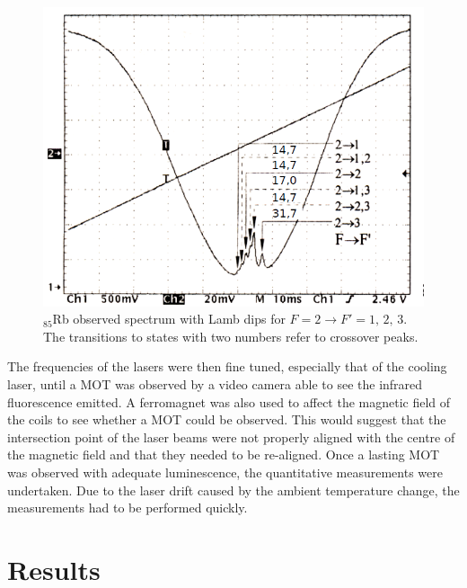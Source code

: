 \documentclass[twocolumn]{article}
\begin{document}
\begin{figure} [!h]
	\centering
	\includegraphics[width=1\linewidth]{Images/Peak1.png}
	\caption{$_{85}$Rb observed spectrum with Lamb dips for $F = 2 \rightarrow F' = 1, \, 2, \, 3$. The transitions to states with two numbers refer to crossover peaks.\cite{manual}}
	\label{fig:Peaks1}
\end{figure}
The frequencies of the lasers were then fine tuned, especially that of the cooling laser, until a MOT was observed by a video camera able to see the infrared fluorescence emitted. A ferromagnet was also used to affect the magnetic field of the coils to see whether a MOT could be observed. This would suggest that the intersection point of the laser beams were not properly aligned with the centre of the magnetic field and that they needed to be re-aligned. Once a lasting MOT was observed with adequate luminescence, the quantitative measurements were undertaken. Due to the laser drift caused by the ambient temperature change, the measurements had to be performed quickly.

\section{Results}
\end{document}
